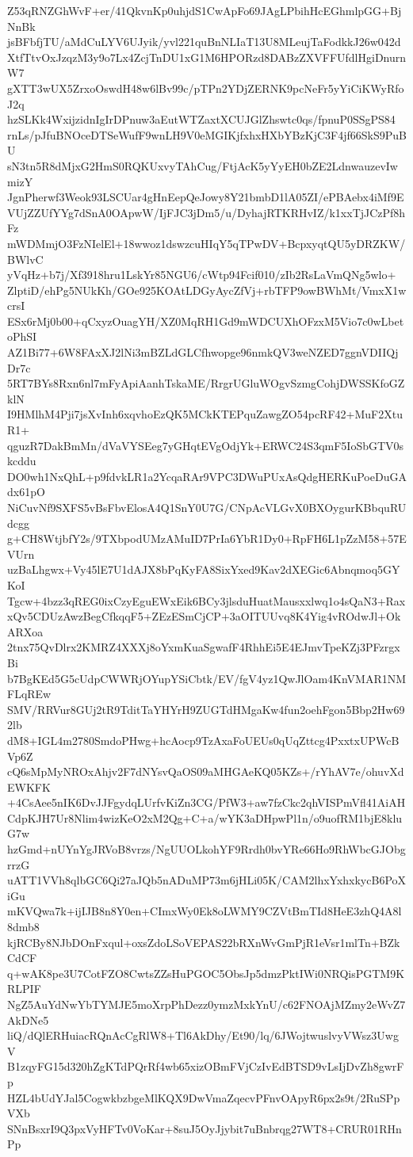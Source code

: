 Z53qRNZGhWvF+er/41QkvnKp0uhjdS1CwApFo69JAgLPbihHcEGhmlpGG+BjNnBk
jsBFbfjTU/aMdCuLYV6UJyik/yvl221quBnNLIaT13U8MLeujTaFodkkJ26w042d
XtfTtvOxJzqzM3y9o7Lx4ZcjTnDU1xG1M6HPORzd8DABzZXVFFUfdlHgiDnurnW7
gXTT3wUX5ZrxoOswdH48w6lBv99c/pTPn2YDjZERNK9pcNeFr5yYiCiKWyRfoJ2q
hzSLKk4WxijzidnIgIrDPnuw3aEutWTZaxtXCUJGlZhswtc0qs/fpnuP0SSgPS84
rnLs/pJfuBNOceDTSeWufF9wnLH9V0eMGIKjfxhxHXbYBzKjC3F4jf66SkS9PuBU
sN3tn5R8dMjxG2HmS0RQKUxvyTAhCug/FtjAcK5yYyEH0bZE2LdnwauzevIwmizY
JgnPherwf3Weok93LSCUar4gHnEepQeJowy8Y21bmbD1lA05ZI/ePBAebx4iMf9E
VUjZZUfYYg7dSnA0OApwW/IjFJC3jDm5/u/DyhajRTKRHvIZ/k1xxTjJCzPf8hFz
mWDMmjO3FzNIelEl+18wwoz1dswzcuHIqY5qTPwDV+BcpxyqtQU5yDRZKW/BWlvC
yVqHz+b7j/Xf3918hru1LskYr85NGU6/cWtp94Fcif010/zIb2RsLaVmQNg5wlo+
ZlptiD/ehPg5NUkKh/GOe925KOAtLDGyAycZfVj+rbTFP9owBWhMt/VmxX1wcrsI
ESx6rMj0b00+qCxyzOuagYH/XZ0MqRH1Gd9mWDCUXhOFzxM5Vio7c0wLbetoPhSI
AZ1Bi77+6W8FAxXJ2lNi3mBZLdGLCfhwopge96nmkQV3weNZED7ggnVDIIQjDr7c
5RT7BYs8Rxn6nl7mFyApiAanhTskaME/RrgrUGluWOgvSzmgCohjDWSSKfoGZklN
I9HMlhM4Pji7jsXvInh6xqvhoEzQK5MCkKTEPquZawgZO54pcRF42+MuF2XtuR1+
qguzR7DakBmMn/dVaVYSEeg7yGHqtEVgOdjYk+ERWC24S3qmF5IoSbGTV0skcddu
DO0wh1NxQhL+p9fdvkLR1a2YcqaRAr9VPC3DWuPUxAsQdgHERKuPoeDuGAdx61pO
NiCuvNf9SXFS5vBsFbvElosA4Q1SnY0U7G/CNpAcVLGvX0BXOygurKBbquRUdcgg
g+CH8WtjbfY2s/9TXbpodUMzAMuID7PrIa6YbR1Dy0+RpFH6L1pZzM58+57EVUrn
uzBaLhgwx+Vy45lE7U1dAJX8bPqKyFA8SixYxed9Kav2dXEGic6Abnqmoq5GYKoI
Tgcw+4bzz3qREG0ixCzyEguEWxEik6BCy3jlsduHuatMausxxlwq1o4sQaN3+Rax
xQv5CDUzAwzBegCfkqqF5+ZEzESmCjCP+3aOITUUvq8K4Yig4vROdwJl+OkARXoa
2tnx75QvDlrx2KMRZ4XXXj8oYxmKuaSgwafF4RhhEi5E4EJmvTpeKZj3PFzrgxBi
b7BgKEd5G5cUdpCWWRjOYupYSiCbtk/EV/fgV4yz1QwJlOam4KnVMAR1NMFLqREw
SMV/RRVur8GUj2tR9TditTaYHYrH9ZUGTdHMgaKw4fun2oehFgon5Bbp2Hw692lb
dM8+IGL4m2780SmdoPHwg+hcAocp9TzAxaFoUEUs0qUqZttcg4PxxtxUPWcBVp6Z
cQ6sMpMyNROxAhjv2F7dNYsvQaOS09aMHGAeKQ05KZs+/rYhAV7e/ohuvXdEWKFK
+4CsAee5nIK6DvJJFgydqLUrfvKiZn3CG/PfW3+aw7fzCkc2qhVISPmVfl41AiAH
CdpKJH7Ur8Nlim4wizKeO2xM2Qg+C+a/wYK3aDHpwPl1n/o9uofRM1bjE8kluG7w
hzGmd+nUYnYgJRVoB8vrzs/NgUUOLkohYF9Rrdh0bvYRe66Ho9RhWbcGJObgrrzG
uATT1VVh8qlbGC6Qi27aJQb5nADuMP73m6jHLi05K/CAM2lhxYxhxkycB6PoXiGu
mKVQwa7k+ijIJB8n8Y0en+CImxWy0Ek8oLWMY9CZVtBmTId8HeE3zhQ4A8l8dmb8
kjRCBy8NJbDOnFxqul+oxsZdoLSoVEPAS22bRXnWvGmPjR1eVsr1mlTn+BZkCdCF
q+wAK8pe3U7CotFZO8CwtsZZsHuPGOC5ObsJp5dmzPktIWi0NRQisPGTM9KRLPIF
NgZ5AuYdNwYbTYMJE5moXrpPhDezz0ymzMxkYnU/c62FNOAjMZmy2eWvZ7AkDNe5
liQ/dQlERHuiacRQnAcCgRlW8+Tl6AkDhy/Et90/lq/6JWojtwuslvyVWsz3UwgV
B1zqyFG15d320hZgKTdPQrRf4wb65xizOBmFVjCzIvEdBTSD9vLsIjDvZh8gwrFp
HZL4bUdYJal5CogwkbzbgeMlKQX9DwVmaZqecvPFnvOApyR6px2s9t/2RuSPpVXb
SNnBsxrI9Q3pxVyHFTv0VoKar+8suJ5OyJjybit7uBnbrqg27WT8+CRUR01RHnPp

